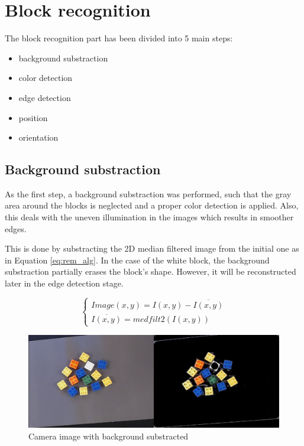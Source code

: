 
\chapter{Block recognition}\label{ch:block_recognition}

The block recognition part has been divided into 5 main steps: 
\begin{itemize}
  \item background substraction
  \item color detection
  \item edge detection
  \item position
  \item orientation
\end{itemize}

\section{Background substraction}
As the first step, a background substraction was performed, such that the gray area around the blocks is neglected and a proper color detection is applied. Also, this deals with the uneven illumination in the images which results in smoother edges. 

This is done by substracting the 2D median filtered image from the initial one as in Equation \ref{eq:rem_alg}. In the case of the white block, the background substraction partially erases the block's shape. However, it will be reconstructed later in the edge detection stage. 

\begin{equation}\label{eq:rem_alg}
  \begin{cases}
    Image(x,y) = I(x,y) - \overline{I(x,y)} \\
    \overline{I(x,y)} = medfilt2(I(x,y))
  \end{cases}
\end{equation}

\begin{figure}[H]
  \centering
  \includegraphics[scale=0.35]{figures/remove_background.png}
  \caption{Camera image with background substracted}
  \label{fig:rem_back}
\end{figure}


